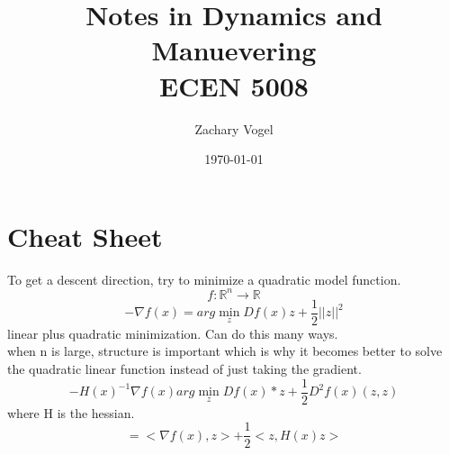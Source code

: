 \documentclass{article}
\author{Zachary Vogel}
\title{Notes in Dynamics and Manuevering\\ ECEN 5008}
\date{\today}
\begin{document}
\maketitle
\section{Cheat Sheet}
To get a descent direction, try to minimize a quadratic model function.\\
\[f:\mathbb{R}^n\to\mathbb{R}\]
\[-\nabla f(x)=arg\min_z Df(x)z+\frac{1}{2}\lvert\lvert z\rvert\rvert^2\]
linear plus quadratic minimization. Can do this many ways.\\
when n is large, structure is important which is why it becomes better to solve the quadratic linear function instead of just taking the gradient.\\
\[-H(x)^{-1}\nabla f(x)arg\min_z Df(x)*z+\frac{1}{2}D^2f(x)(z,z)\]
where H is the hessian.
\[=<\nabla f(x),z>+\frac{1}{2}<z,H(x)z>\]
\end{document}
